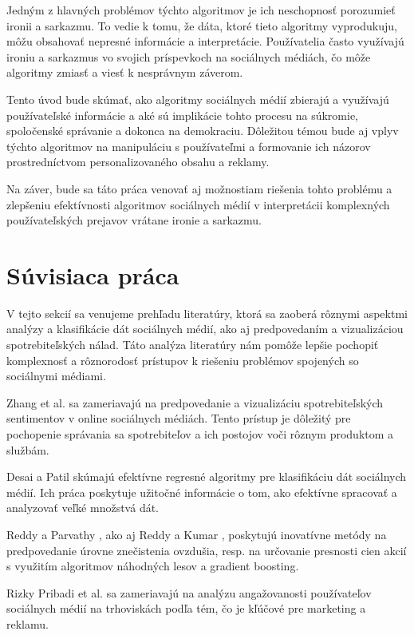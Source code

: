\documentclass[12pt,twoside,slovak,a4paper]{article}
\begin{document}
Jedným z hlavných problémov týchto algoritmov je ich neschopnosť porozumieť ironii a sarkazmu. To vedie k tomu, že dáta, ktoré tieto algoritmy vyprodukuju, môžu obsahovať nepresné informácie a interpretácie. Používatelia často využívajú ironiu a sarkazmus vo svojich príspevkoch na sociálnych médiách, čo môže algoritmy zmiasť a viesť k nesprávnym záverom.

Tento úvod bude skúmať, ako algoritmy sociálnych médií zbierajú a využívajú používateľské informácie a aké sú implikácie tohto procesu na súkromie, spoločenské správanie a dokonca na demokraciu. Dôležitou témou bude aj vplyv týchto algoritmov na manipuláciu s používateľmi a formovanie ich názorov prostredníctvom personalizovaného obsahu a reklamy.

Na záver, bude sa táto práca venovať aj možnostiam riešenia tohto problému a zlepšeniu efektívnosti algoritmov sociálnych médií v interpretácii komplexných používateľských prejavov vrátane ironie a sarkazmu.
\cite{7087040} \cite{7783248}


\section{Súvisiaca práca}


V tejto sekcií sa venujeme prehľadu literatúry, ktorá sa zaoberá rôznymi aspektmi analýzy a klasifikácie dát sociálnych médií, ako aj predpovedaním a vizualizáciou spotrebiteľských nálad. Táto analýza literatúry nám pomôže lepšie pochopiť komplexnosť a rôznorodosť prístupov k riešeniu problémov spojených so sociálnymi médiami.

Zhang et al. \cite{7809906} sa zameriavajú na predpovedanie a vizualizáciu spotrebiteľských sentimentov v online sociálnych médiách. Tento prístup je dôležitý pre pochopenie správania sa spotrebiteľov a ich postojov voči rôznym produktom a službám.

Desai a Patil \cite{7087040} skúmajú efektívne regresné algoritmy pre klasifikáciu dát sociálnych médií. Ich práca poskytuje užitočné informácie o tom, ako efektívne spracovať a analyzovať veľké množstvá dát.

Reddy a Parvathy \cite{9952138}, ako aj Reddy a Kumar \cite{9952143}, poskytujú inovatívne metódy na predpovedanie úrovne znečistenia ovzdušia, resp. na určovanie presnosti cien akcií s využitím algoritmov náhodných lesov a gradient boosting.

Rizky Pribadi et al. \cite{10057722} sa zameriavajú na analýzu angažovanosti používateľov sociálnych médií na trhoviskách podľa tém, čo je kľúčové pre marketing a reklamu.
\end{document}
